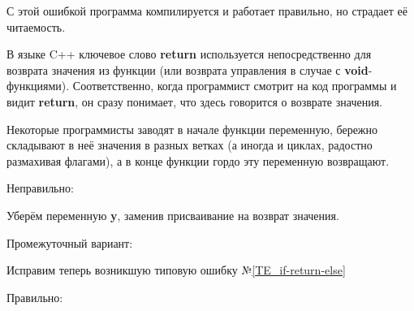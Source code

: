 \begin{typerror}
	\label{TE_variable-only-for-return}

	С этой ошибкой программа компилируется и работает правильно,
	но страдает её читаемость.

	В языке C++ ключевое слово \textbf{return} используется непосредственно для возврата значения из функции
	(или возврата управления в случае с \textbf{void}-функциями).
	Соответственно, когда программист смотрит на код программы и видит \textbf{return},
	он сразу понимает, что здесь говорится о возврате значения.
	
	Некоторые программисты заводят в начале функции переменную,
	бережно складывают в неё значения в разных ветках
	(а иногда и циклах, радостно размахивая флагами),
	а в конце функции гордо эту переменную возвращают.	

	Неправильно:

	Уберём переменную \textbf{y}, заменив присваивание на возврат значения.

	Промежуточный вариант:
	
	Исправим теперь возникшую типовую ошибку №\ref{TE_if-return-else}

	Правильно:

\end{typerror}
